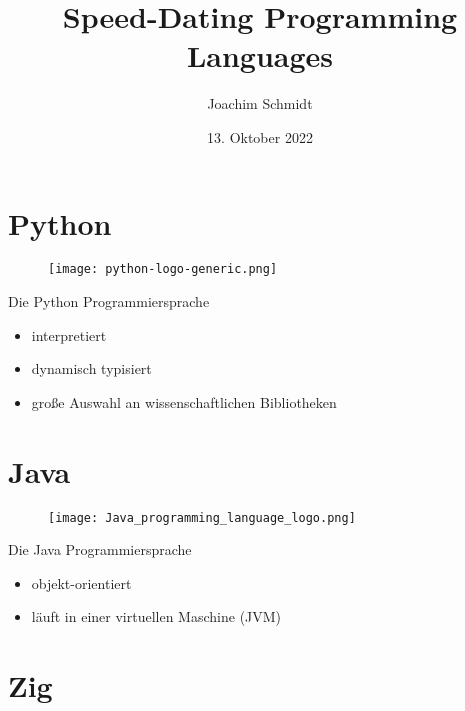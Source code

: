 \documentclass[aspectratio=169]{beamer}
\title{Speed-Dating Programming Languages}
\author{Joachim Schmidt}
\date{13. Oktober 2022}
\begin{document}

\begin{frame}{}
  \tableofcontents
\end{frame}

\section{Python}

\begin{frame}{}
  \begin{figure}
    \centering
    \texttt{[image: python-logo-generic.png]}
    \caption{\cite{python_logo}}
    \label{fig:python_logo}
  \end{figure}
\end{frame}

\begin{frame}{Die Python Programmiersprache}
  \begin{itemize}
  \item interpretiert
  \item dynamisch typisiert
  \item große Auswahl an wissenschaftlichen Bibliotheken
  \end{itemize}
\end{frame}

\section{Java}

\begin{frame}{}
  \begin{figure}
    \centering
    \texttt{[image: Java\_programming\_language\_logo.png]}
    \caption{\cite{java_logo}}
    \label{fig:java_logo}
  \end{figure}
\end{frame}

\begin{frame}{Die Java Programmiersprache}
  \begin{itemize}
  \item objekt-orientiert
  \item läuft in einer virtuellen Maschine (JVM)
  \end{itemize}
\end{frame}

\section{Zig}
\end{document}
